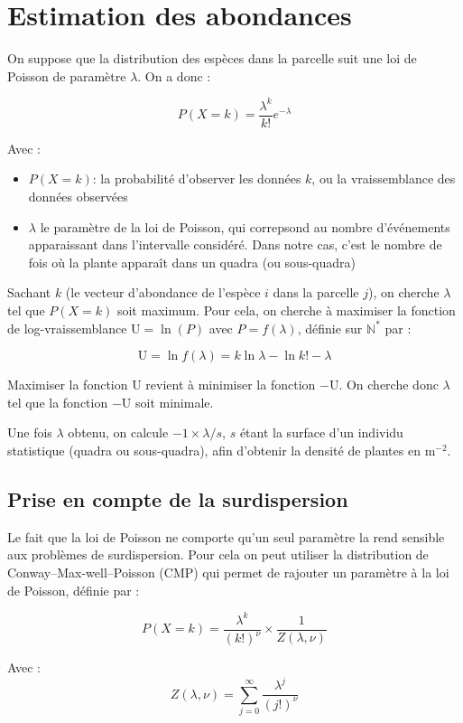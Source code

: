 \documentclass[a4paper, 12pt]{article}
\begin{document}
\section{Estimation des abondances}

On suppose que la distribution des espèces dans la parcelle suit une loi de
Poisson de paramètre $\lambda$.
On a donc :

\[
  P(X = k) = \frac{\lambda^k}{k!} e^{-\lambda}
\]

Avec :
\begin{itemize}
  \item $P(X = k)$: la probabilité d'observer les données $k$, ou la
    vraissemblance des données observées
  \item $\lambda$ le paramètre de la loi de Poisson, qui correpsond au nombre
    d'événements apparaissant dans l'intervalle considéré. Dans notre cas, c'est
    le nombre de fois où la plante apparaît dans un quadra (ou sous-quadra)
\end{itemize}

Sachant $k$ (le vecteur d'abondance de l'espèce $i$ dans la parcelle $j$), on
cherche $\lambda$ tel que $P(X=k)$ soit maximum.
Pour cela, on cherche à maximiser la fonction de log-vraissemblance $\mathrm{U}
= \ln(P)$ avec $ P = f(\lambda)$, définie sur $\mathbb{N}^*$ par :

\[
  \mathrm{U} = \ln f(\lambda) = k\ln \lambda - \ln k! - \lambda
\]

Maximiser la fonction U revient à minimiser la fonction $-\mathrm{U}$.
On cherche donc $\lambda$ tel que la fonction $-\mathrm{U}$ soit minimale.

Une fois $\lambda$ obtenu, on calcule $-1 \times\lambda / s$, $s$ étant la
surface d'un individu statistique (quadra ou sous-quadra), afin d'obtenir la
densité de plantes en $\mathrm{m}^{-2}$.


\subsection{Prise en compte de la surdispersion}

Le fait que la loi de Poisson ne comporte qu'un seul paramètre la rend sensible
aux problèmes de surdispersion.
Pour cela on peut utiliser la distribution de Conway–Max-well–Poisson (CMP) qui
permet de rajouter un paramètre à la loi de Poisson, définie par :

\[
  P(X = k) = \frac{\lambda^k}{(k!)^\nu} \times \frac{1}{Z(\lambda,\nu)}
\]

Avec :
\[
  Z(\lambda,\nu) = \sum^{\infty}_{j=0}\frac{\lambda^j}{(j!)^{\nu}}
\]
\end{document}
